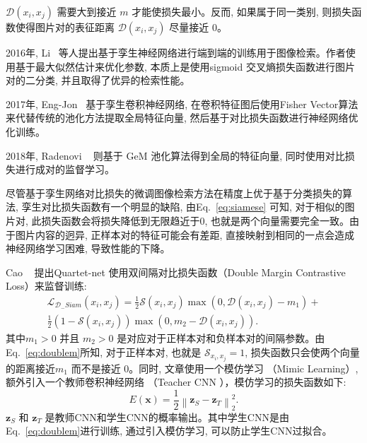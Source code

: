 $\mathcal{D}(x_i,x_j)$ 需要大到接近 $m$ 才能使损失最小。反而, 如果属于同一类别, 则损失函数使得图片对的表征距离 $\mathcal{D}(x_i, x_j)$ 尽量接近 0。\par
2016年, Li~\cite{li2015feature} 等人提出基于孪生神经网络进行端到端的训练用于图像检索。作者使用基于最大似然估计来优化参数, 本质上是使用sigmoid 交叉熵损失函数进行图片对的二分类, 并且取得了优异的检索性能。 \par
2017年, Eng-Jon~\cite{Eng-Jon} 基于孪生卷积神经网络, 在卷积特征图后使用Fisher Vector算法来代替传统的池化方法提取全局特征向量, 然后基于对比损失函数进行神经网络优化训练。\par
2018年, Radenovi ~\cite{radenovic2018fine} 则基于 GeM 池化算法得到全局的特征向量, 同时使用对比损失进行成对的监督学习。 \par
尽管基于孪生网络对比损失的微调图像检索方法在精度上优于基于分类损失的算法, 孪生对比损失函数有一个明显的缺陷, 由Eq.~\ref{eq:siamese} 可知, 对于相似的图片对, 此损失函数会将损失降低到无限趋近于0, 也就是两个向量需要完全一致。由于图片内容的迥异, 正样本对的特征可能会有差距, 直接映射到相同的一点会造成神经网络学习困难, 导致性能的下降。 \par
Cao ~\cite{cao2016quartet} 提出Quartet-net 使用双间隔对比损失函数（Double Margin Contrastive Loss）来监督训练:
\begin{equation}
    \begin{array}{r}
        \mathcal{L}_{\mathcal{D}_{-} S i a m}\left(x_i, x_j\right)=\frac{1}{2} \mathcal{S}\left(x_i, x_j\right) \max \left(0, \mathcal{D}\left(x_i, x_j\right)-m_1\right)+ \\
        \frac{1}{2}\left(1-\mathcal{S}\left(x_i, x_j\right)\right) \max \left(0, m_2-\mathcal{D}\left(x_i, x_j\right)\right).
        \end{array}
        \label{eq:doublem}
\end{equation}
其中$m_1 > 0$ 并且 $m_2 > 0$ 是对应对于正样本对和负样本对的间隔参数。由 Eq.~\ref{eq:doublem}所知, 对于正样本对, 也就是 $\mathcal{S}_{x_i, x_j} = 1$, 损失函数只会使两个向量的距离接近$m_1$ 而不是接近 $0$。同时, 文章使用一个模仿学习 （Mimic Learning）, 额外引入一个教师卷积神经网络 （Teacher CNN ），模仿学习的损失函数如下:
\begin{equation}
    E(\mathbf{x})=\frac{1}{2}\left\|\mathbf{z}_S-\mathbf{z}_T\right\|_2^2.
\end{equation}
$\mathbf{z}_S$ 和 $\mathbf{z}_{T}$ 是教师CNN和学生CNN的概率输出。其中学生CNN是由Eq.~\ref{eq:doublem}进行训练, 通过引入模仿学习, 可以防止学生CNN过拟合。 \par
